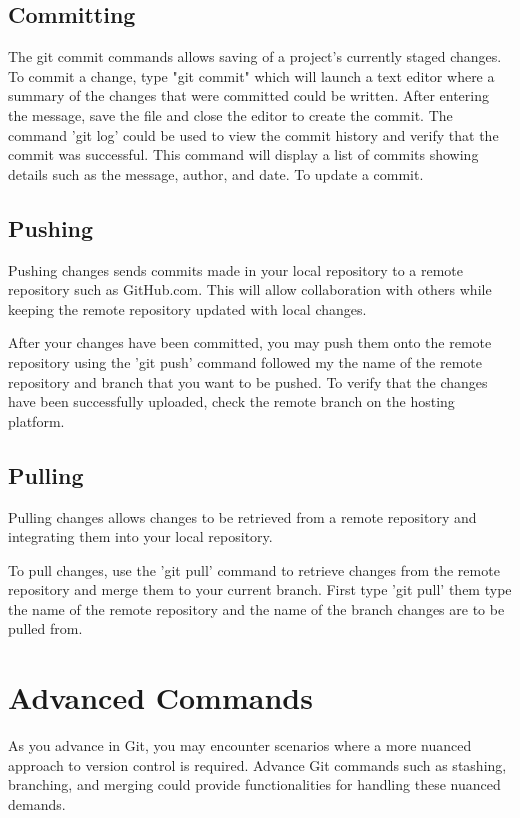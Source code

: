 \documentclass[10pt,twocolumn]{article}
\begin{document}
\subsection{Committing}
The git commit  commands allows saving of a project's currently staged changes. To commit a change, type "git commit" which will launch a text editor where a summary of the changes that were committed could be written. After entering the message, save the file and close the editor to create the commit. The command 'git log' could be used to view the commit history and verify that the commit was successful. This command will display a list of commits showing details such as the message, author, and date. 
To update a commit. 
\subsection{Pushing}
Pushing changes sends commits made in your local repository to a remote repository such as GitHub.com. This will allow collaboration with others while keeping the remote repository updated with local changes. 

After your changes have been committed, you may push them onto the remote repository using the 'git push' command followed my the name of the remote repository and branch that you want to be pushed. To verify that the changes have been successfully uploaded, check the remote branch on the hosting platform. 

\subsection{Pulling}
Pulling changes allows changes to be retrieved from a remote repository and integrating them into your local repository. 

To pull changes, use the 'git pull' command to retrieve changes from the remote repository and merge them to your current branch. First type 'git pull' them type the name of the remote repository and the name of the branch changes are to be pulled from. 

\section{Advanced Commands}
As you advance in Git, you may encounter scenarios where a more nuanced approach to version control is required. Advance Git commands such as stashing, branching, and merging could provide functionalities for handling these nuanced demands.  
\end{document}
